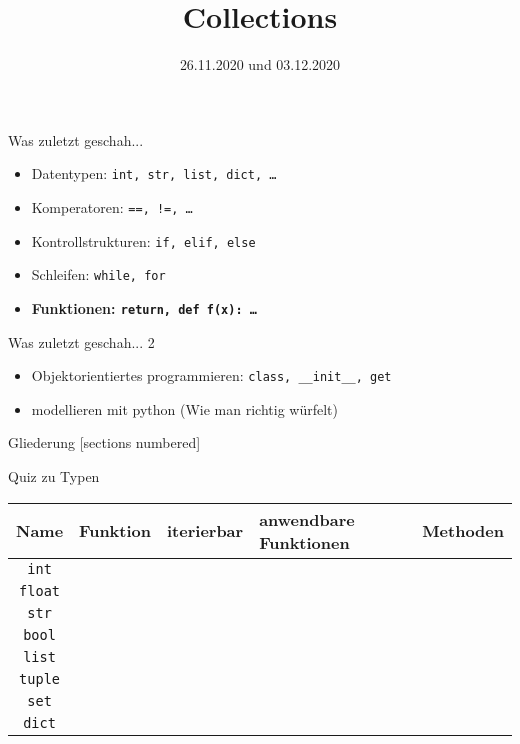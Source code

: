 



\title{Collections}
\date{26.11.2020 und 03.12.2020}



	
\maketitle

\begin{frame}{Was zuletzt geschah...}
	\begin{itemize}
		\item Datentypen: \texttt{int, str, list, dict, \ldots}
		\item Komperatoren: \texttt{==, !=, \ldots}
		\item Kontrollstrukturen: \texttt{if, elif, else}
		\item Schleifen: \texttt{while, for}
		\item \textbf{\alert{Funktionen: \texttt{return, def f(x): \ldots}}}
	\end{itemize}
\end{frame}

\begin{frame}{Was zuletzt geschah... 2}
	\begin{itemize}
		\item Objektorientiertes programmieren: \texttt{class, \_\_init\_\_, get}
		\item modellieren mit python (Wie man richtig würfelt)
	\end{itemize}
\end{frame}

\begin{frame}{Gliederung}
	[sections numbered]
	\tableofcontents
\end{frame}

\begin{frame}{Quiz zu Typen}
	\footnotesize
	\begin{tabular}{c|l|l|l|l}
		Name & Funktion &iterierbar &anwendbare Funktionen &  Methoden\\ 
		\hline
		\texttt{int} & &&& \\
		\texttt{float} &  &&& \\
		\texttt{str} &  &&& \\
		\texttt{bool} &  &&&\\ \hline
		\texttt{list} &  &&& \\
		\texttt{tuple} & &&& \\
		\texttt{set} &  &&& \\
		\texttt{dict} &  &&& \\
	\end{tabular}
\end{frame}

